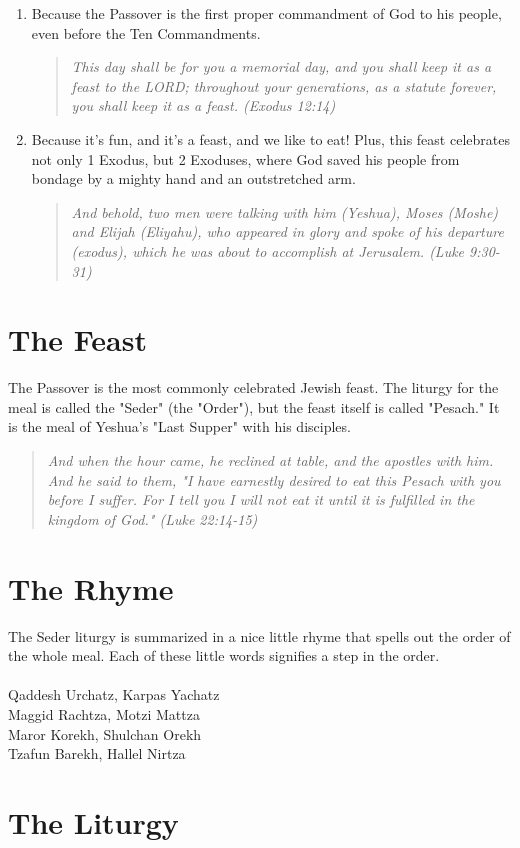 \documentclass[10pt,oneside,footinclude=true,headinclude=true]{scrbook} %
\newcommand\quot[1]{
	\begin{quote}\textit{\small#1}\end{quote}
}
\begin{document}
\begin{enumerate}
{	}
	\item{
		Because the Passover is the first proper commandment of God to his people, even before the Ten Commandments.
		\quot{This day shall be for you a memorial day, and you shall keep it as a feast to the LORD; throughout your generations, as a statute forever, you shall keep it as a feast. (Exodus 12:14)}
	}
	\item{
		Because it's fun, and it's a feast, and we like to eat! Plus, this feast celebrates not only 1 Exodus, but 2 Exoduses, where God saved his people from bondage by a mighty hand and an outstretched arm.
		\quot{And behold, two men were talking with him (Yeshua), Moses (Moshe) and Elijah (Eliyahu), who appeared in glory and spoke of his departure (exodus), which he was about to accomplish at Jerusalem. (Luke 9:30-31)}
	}
\end{enumerate}


\section{The Feast}
The Passover is the most commonly celebrated Jewish feast. The liturgy for the meal is called the "Seder" (the "Order"), but the feast itself is called "Pesach." It is the meal of Yeshua's "Last Supper" with his disciples.

\quot{And when the hour came, he reclined at table, and the apostles with him. And he said to them, "I have earnestly desired to eat this Pesach with you before I suffer. For I tell you I will not eat it until it is fulfilled in the kingdom of God." (Luke 22:14-15)}


\section{The Rhyme}

The Seder liturgy is summarized in a nice little rhyme that spells out the order of the whole meal. Each of these little words signifies a step in the order.\\
\\
Qaddesh Urchatz, Karpas Yachatz\\
Maggid Rachtza, Motzi Mattza\\
Maror Korekh, Shulchan Orekh\\
Tzafun Barekh, Hallel Nirtza


\section{The Liturgy}
\end{document}
